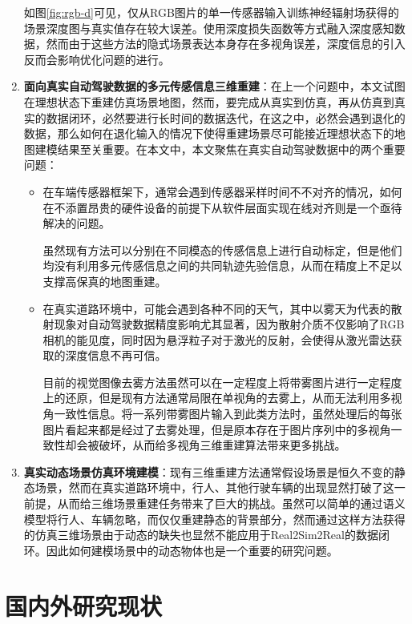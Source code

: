 \begin{enumerate}
    如图\ref{fig:rgb-d}可见，仅从RGB图片的单一传感器输入训练神经辐射场获得的场景深度图与真实值存在较大误差。使用深度损失函数等方式融入深度感知数据，然而由于这些方法的隐式场景表达本身存在多视角误差，深度信息的引入反而会影响优化问题的进行。

    \item \textbf{面向真实自动驾驶数据的多元传感信息三维重建}：在上一个问题中，本文试图在理想状态下重建仿真场景地图，然而，要完成从真实到仿真，再从仿真到真实的数据闭环，必然要进行长时间的数据迭代，在这之中，必然会遇到退化的数据，那么如何在退化输入的情况下使得重建场景尽可能接近理想状态下的地图建模结果至关重要。在本文中，本文聚焦在真实自动驾驶数据中的两个重要问题：
    \begin{itemize}
        \item 在车端传感器框架下，通常会遇到传感器采样时间不不对齐的情况，如何在不添置昂贵的硬件设备的前提下从软件层面实现在线对齐则是一个亟待解决的问题。

        虽然现有方法可以分别在不同模态的传感信息上进行自动标定，但是他们均没有利用多元传感信息之间的共同轨迹先验信息，从而在精度上不足以支撑高保真的地图重建。
        
        \item 在真实道路环境中，可能会遇到各种不同的天气，其中以雾天为代表的散射现象对自动驾驶数据精度影响尤其显著，因为散射介质不仅影响了RGB相机的能见度，同时因为悬浮粒子对于激光的反射，会使得从激光雷达获取的深度信息不再可信。

        目前的视觉图像去雾方法虽然可以在一定程度上将带雾图片进行一定程度上的还原，但是现有方法通常局限在单视角的去雾上，从而无法利用多视角一致性信息。将一系列带雾图片输入到此类方法时，虽然处理后的每张图片看起来都是经过了去雾处理，但是原本存在于图片序列中的多视角一致性却会被破坏，从而给多视角三维重建算法带来更多挑战。
    \end{itemize}

    \item \textbf{真实动态场景仿真环境建模}：现有三维重建方法通常假设场景是恒久不变的静态场景，然而在真实道路环境中，行人、其他行驶车辆的出现显然打破了这一前提，从而给三维场景重建任务带来了巨大的挑战。虽然可以简单的通过语义模型将行人、车辆忽略，而仅仅重建静态的背景部分，然而通过这样方法获得的仿真三维场景由于动态的缺失也显然不能应用于Real2Sim2Real的数据闭环。因此如何建模场景中的动态物体也是一个重要的研究问题。
\end{enumerate}

\section{国内外研究现状}


